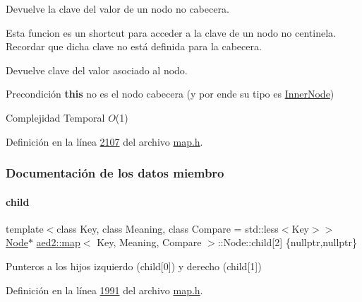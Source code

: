 Devuelve la clave del valor de un nodo no cabecera. 

Esta funcion es un shortcut para acceder a la clave de un nodo no centinela. Recordar que dicha clave no está definida para la cabecera.

\begin{DoxyReturn}{Devuelve}
clave del valor asociado al nodo.
\end{DoxyReturn}
\begin{DoxyPrecond}{Precondición}
{\bfseries this} no es el nodo cabecera (y por ende su tipo es \hyperlink{structaed2_1_1map_1_1InnerNode}{Inner\+Node})
\end{DoxyPrecond}

\begin{DoxyDescription}
\item[Complejidad Temporal]$O$(1)
\end{DoxyDescription}

Definición en la línea \hyperlink{map_8h_source_l02107}{2107} del archivo \hyperlink{map_8h_source}{map.\+h}.



\subsubsection{Documentación de los datos miembro}
\mbox{\label{structaed2_1_1map_1_1Node_a7d65c374c73c443a46d8fc224aff9e82_a7d65c374c73c443a46d8fc224aff9e82}} 
\paragraph{\texorpdfstring{child}{child}}
{\footnotesize\ttfamily template$<$class Key, class Meaning, class Compare = std\+::less$<$\+Key$>$$>$ \\
\hyperlink{structaed2_1_1map_1_1Node}{Node}$\ast$ \hyperlink{classaed2_1_1map}{aed2\+::map}$<$ Key, Meaning, Compare $>$\+::Node\+::child\mbox{[}2\mbox{]} \{nullptr,nullptr\}}



Punteros a los hijos izquierdo (child\mbox{[}0\mbox{]}) y derecho (child\mbox{[}1\mbox{]}) 



Definición en la línea \hyperlink{map_8h_source_l01991}{1991} del archivo \hyperlink{map_8h_source}{map.\+h}.

